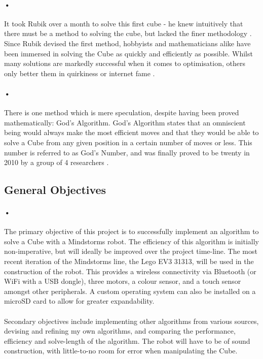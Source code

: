 \documentclass{article}
\begin{document}
\paragraph{•}
It took Rubik over a month to solve this first cube - he knew intuitively that there must be a method to solving the cube, but lacked the finer methodology \cite{RubiksCube}. Since Rubik devised the first method, hobbyists and mathematicians alike have been immersed in solving the Cube as quickly and efficiently as possible. Whilst many solutions are markedly successful when it comes to optimisation, others only better them in quirkiness or internet fame \cite{Chan2016}.
\paragraph{•}
There is one method which is mere speculation, despite having been proved mathematically: God's Algorithm. God's Algorithm states that an omniscient being would always make the most efficient moves and that they would be able to solve a Cube from any given position in a certain number of moves or less. This number is referred to as God's Number, and was finally proved to be twenty in 2010 by a group of 4 researchers \cite{Rokicki2010b}.

\subsection{General Objectives}
\paragraph{•}
The primary objective of this project is to successfully implement an algorithm to solve a Cube with a Mindstorms robot. The efficiency of this algorithm is initially non-imperative, but will ideally be improved over the project time-line. The most recent iteration of the Mindstorms line, the Lego EV3 31313, will be used in the construction of the robot. This provides a wireless connectivity via Bluetooth (or WiFi with a USB dongle), three motors, a colour sensor, and a touch sensor amongst other peripherals. A custom operating system can also be installed on a microSD card to allow for greater expandability. 
\paragraph{}
Secondary objectives include implementing other algorithms from various sources, devising and refining my own algorithms, and comparing the performance, efficiency and solve-length of the algorithm. The robot will have to be of sound construction, with little-to-no room for error when manipulating the Cube.
\end{document}
